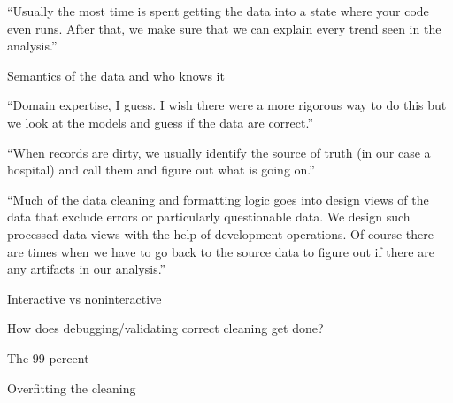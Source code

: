 “Usually the most time is spent getting the data into a state where your code even runs. After that, we make sure that we can explain every trend seen in the analysis.”

Semantics of the data and who knows it

“Domain expertise, I guess. I wish there were a more rigorous way to do this but we look at the models and guess if the data are correct.”

“When records are dirty, we usually identify the source of truth (in our case a hospital) and call them and figure out what is going on.”

“Much of the data cleaning and formatting logic goes into design views of the data that exclude errors or particularly questionable data. We design such processed data views with the help of development operations. Of course there are times when we have to go back to the source data to figure out if there are any artifacts in our analysis.”





Interactive vs noninteractive

How does debugging/validating correct cleaning get done?

The 99 percent

Overfitting the cleaning
